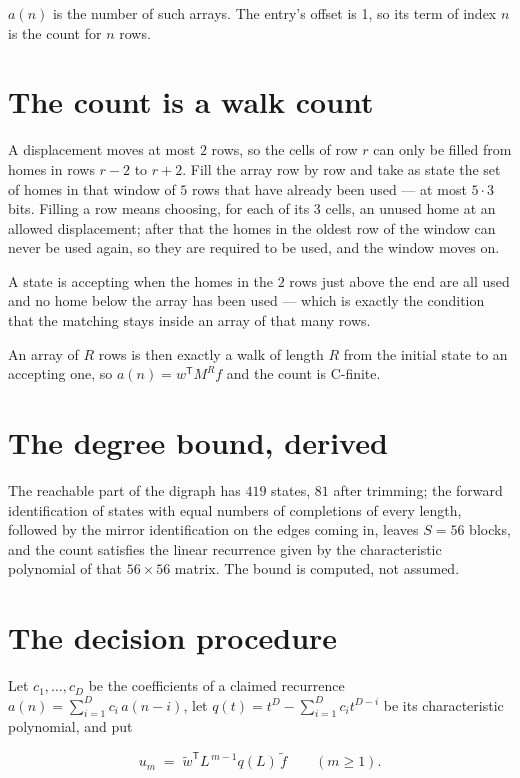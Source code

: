 \documentclass[11pt]{article}
\theoremstyle{definition}
\begin{document}
$a(n)$ is the number of such arrays. The entry's offset is 1, so its term of index $n$ is the count for $n$ rows.

\section{The count is a walk count}

A displacement moves at most $2$ rows, so the cells of row $r$ can only be filled from homes in rows $r-2$ to $r+2$. Fill the array row by row and take as state the set of homes in that window of $5$ rows that have already been used --- at most $5\cdot3$ bits. Filling a row means choosing, for each of its $3$ cells, an unused home at an allowed displacement; after that the homes in the oldest row of the window can never be used again, so they are required to be used, and the window moves on.

A state is accepting when the homes in the $2$ rows just above the end are all used and no home below the array has been used --- which is exactly the condition that the matching stays inside an array of that many rows.

An array of $R$ rows is then exactly a walk of length $R$ from the initial state to an accepting one, so $a(n) = w^{\mathsf T}M^{R}f$ and the count is C-finite.

\section{The degree bound, derived}

The reachable part of the digraph has $419$ states, $81$ after trimming; the forward identification of states with equal numbers of completions of every length, followed by the mirror identification on the edges coming in, leaves $S = 56$ blocks, and the count satisfies the linear recurrence given by the characteristic polynomial of that $56\times56$ matrix. The bound is computed, not assumed.

\section{The decision procedure}

Let $c_1,\dots,c_D$ be the coefficients of a claimed recurrence $a(n) = \sum_{i=1}^{D} c_i\,a(n-i)$, let $q(t) = t^{D} - \sum_{i=1}^{D} c_i t^{D-i}$ be its characteristic polynomial, and put

\[u_m \;=\; \tilde w^{\mathsf T} L^{\,m-1} q(L)\,\tilde f \qquad (m \ge 1).\]
\end{document}
